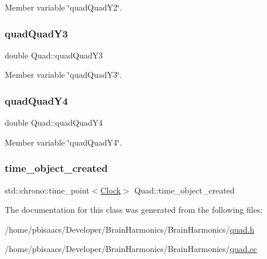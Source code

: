 Member variable \char`\"{}quad\+Quad\+Y2\char`\"{}. 

\mbox{\label{classQuad_a71c344b5032f910a34a8ffef7ba894c0}} 
\subsubsection{\texorpdfstring{quad\+Quad\+Y3}{quadQuadY3}}
{\footnotesize\ttfamily double Quad\+::quad\+Quad\+Y3\hspace{0.3cm}{\ttfamily [private]}}



Member variable \char`\"{}quad\+Quad\+Y3\char`\"{}. 

\mbox{\label{classQuad_a0e7d3d2357464cbe78d73750b2399d95}} 
\subsubsection{\texorpdfstring{quad\+Quad\+Y4}{quadQuadY4}}
{\footnotesize\ttfamily double Quad\+::quad\+Quad\+Y4\hspace{0.3cm}{\ttfamily [private]}}



Member variable \char`\"{}quad\+Quad\+Y4\char`\"{}. 

\mbox{\label{classQuad_a5779e2e09362b665bccd2ae4e29602ff}} 
\subsubsection{\texorpdfstring{time\+\_\+object\+\_\+created}{time\_object\_created}}
{\footnotesize\ttfamily std\+::chrono\+::time\+\_\+point$<$\mbox{\hyperlink{universe_8h_a0ef8d951d1ca5ab3cfaf7ab4c7a6fd80}{Clock}}$>$ Quad\+::time\+\_\+object\+\_\+created\hspace{0.3cm}{\ttfamily [private]}}



The documentation for this class was generated from the following files\+:\begin{DoxyCompactItemize}
\item 
/home/pbisaacs/\+Developer/\+Brain\+Harmonics/\+Brain\+Harmonics/\mbox{\hyperlink{quad_8h}{quad.\+h}}\item 
/home/pbisaacs/\+Developer/\+Brain\+Harmonics/\+Brain\+Harmonics/\mbox{\hyperlink{quad_8cc}{quad.\+cc}}\end{DoxyCompactItemize}
